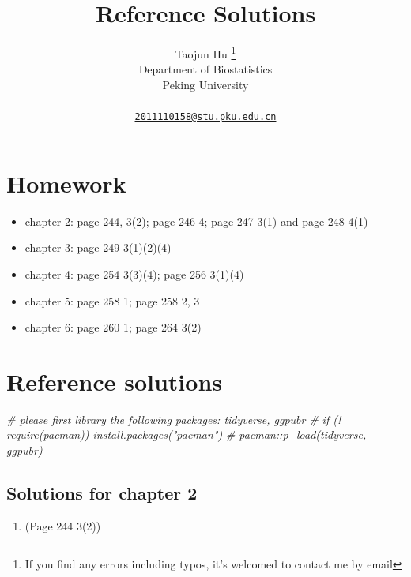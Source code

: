 \documentclass{article}
\title{Reference Solutions}
\author{
    Taojun Hu
    \thanks{If you find any errors including typos, it's welcomed to
contact me by email}
   \\
    Department of Biostatistics \\
    Peking University \\
   \\
  \texttt{\href{mailto:2011110158@stu.pku.edu.cn}{\nolinkurl{2011110158@stu.pku.edu.cn}}} \\
  }
\newenvironment{Shaded}{\begin{snugshade}}{\end{snugshade}}
\newcommand{\CommentTok}[1]{\textcolor[rgb]{0.56,0.35,0.01}{\textit{#1}}}
\begin{document}
\maketitle

\def\tightlist{}


\begin{abstract}

\end{abstract}


\hypertarget{homework}{%
\section{Homework}\label{homework}}

\begin{itemize}
\tightlist
\item
  chapter 2: page 244, 3(2); page 246 4; page 247 3(1) and page 248 4(1)
\item
  chapter 3: page 249 3(1)(2)(4)
\item
  chapter 4: page 254 3(3)(4); page 256 3(1)(4)
\item
  chapter 5: page 258 1; page 258 2, 3
\item
  chapter 6: page 260 1; page 264 3(2)
\end{itemize}

\hypertarget{reference-solutions}{%
\section{Reference solutions}\label{reference-solutions}}

\begin{Shaded}
\begin{Highlighting}[]
\CommentTok{\# please first library the following packages: tidyverse, ggpubr}
\CommentTok{\# if (! require(pacman)) install.packages("pacman")}
\CommentTok{\# pacman::p\_load(tidyverse, ggpubr)}
\end{Highlighting}
\end{Shaded}

\hypertarget{solutions-for-chapter-2}{%
\subsection{Solutions for chapter 2}\label{solutions-for-chapter-2}}

\begin{enumerate}
\def\labelenumi{\arabic{enumi}.}
\tightlist
\item
  (Page 244 3(2))
\end{enumerate}
\end{document}
